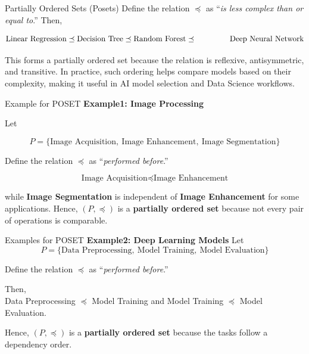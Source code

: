 \documentclass{beamer}
\begin{document}
\begin{frame}{Partially Ordered Sets (Posets)}
Define the relation $\preceq$ as ``\emph{is less complex than or equal to}.'' Then,


\[
\text{Linear Regression}
\preceq
\text{Decision Tree}
\preceq
\text{Random Forest}
\preceq\\\hspace{1.5cm}
\text{Deep Neural Network}
\]

    

This forms a partially ordered set because the relation is reflexive, antisymmetric, and transitive. In practice, such ordering helps compare models based on their complexity, making it useful in AI model selection and Data Science workflows.

\end{frame}


\begin{frame}{Example for POSET}
\textbf{Example1: Image Processing}

Let

\[
P=\{\text{Image Acquisition},\ \text{Image Enhancement},\ \text{Image Segmentation}\}
\]

Define the relation $\preceq$ as ``\emph{performed before}.''

\[
\text{Image Acquisition}
\preceq
\text{Image Enhancement}
\]

while \textbf{Image Segmentation} is independent of \textbf{Image Enhancement} for some applications.
Hence, $(P,\preceq)$ is a \textbf{partially ordered set} because not every pair of operations is comparable.
    
\end{frame}

\begin{frame}{Examples for POSET}
\textbf{Example2: Deep Learning Models}
Let
\[
P=\{\text{Data Preprocessing},\ \text{Model Training},\ \text{Model Evaluation}\}
\]

Define the relation $\preceq$ as ``\emph{performed before}.''
\vspace{0.3cm}

Then,\\ Data Preprocessing $\preceq$ Model Training and Model Training $\preceq$ Model Evaluation.
\vspace{0.3cm}

Hence, $(P,\preceq)$ is a \textbf{partially ordered set} because the tasks follow a dependency order.
\end{frame}
\end{document}

